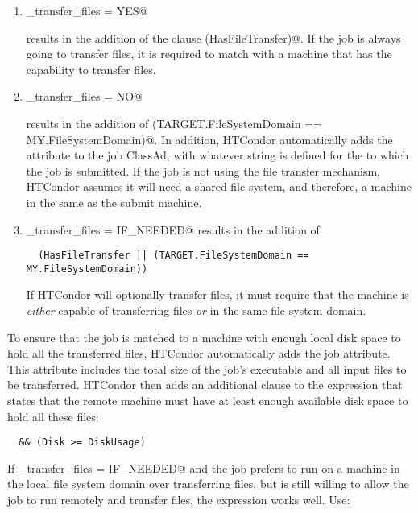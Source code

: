 \begin{enumerate}

\item 
\verb@should_transfer_files = YES@ 

  results in the addition of the clause \verb@(HasFileTransfer)@.
  If the job is always going to transfer files, it is required to 
  match with a machine that has the capability to transfer files.

\item 
\verb@should_transfer_files = NO@

  results in the addition of
  \verb@(TARGET.FileSystemDomain == MY.FileSystemDomain)@.
  In addition, HTCondor automatically adds the
   attribute to the job ClassAd, with whatever
  string is defined for the  to which the job is
  submitted.
  If the job is not using the file transfer mechanism, HTCondor assumes
  it will need a shared file system, and therefore, a machine in the
  same  as the submit machine.

\item \verb@should_transfer_files = IF_NEEDED@
  results in the addition of
\footnotesize
\begin{verbatim}
  (HasFileTransfer || (TARGET.FileSystemDomain == MY.FileSystemDomain))
\end{verbatim}
\normalsize
  If HTCondor will optionally transfer files, it must require
  that the machine is \emph{either} capable of transferring files
  \emph{or} in the same file system domain.

\end{enumerate}

To ensure that the job is matched to a machine with enough local disk
space to hold all the transferred files, HTCondor automatically adds the
 job attribute.
This attribute includes the total
size of the job's executable and all input files to be transferred.
HTCondor then adds an additional clause to the 
expression that states that the remote machine must have at least
enough available disk space to hold all these files:
\begin{verbatim}
  && (Disk >= DiskUsage)
\end{verbatim}

If \verb@should_transfer_files = IF_NEEDED@ and the job prefers
to run on a machine in the local file system domain
over transferring files,
but is still willing to allow the job to run remotely and transfer files,
the  expression works well.  Use:

